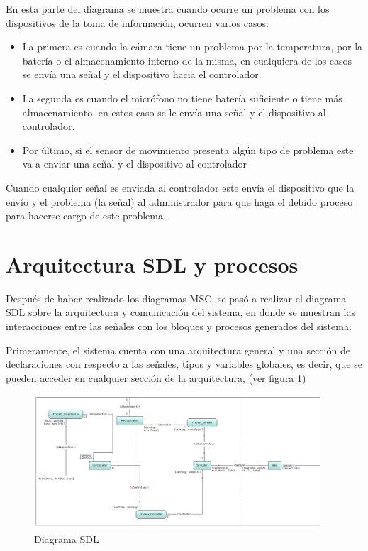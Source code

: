 En esta parte del diagrama se muestra cuando ocurre un problema con los dispositivos de la toma de información, ocurren varios casos:

\begin{itemize}
    \item La primera es cuando la cámara tiene un problema por la temperatura, por la batería o el almacenamiento interno de la misma, en cualquiera de los casos se envía una señal y el dispositivo hacia el controlador.
    \item La segunda es cuando el micrófono no tiene batería suficiente o tiene más almacenamiento, en estos caso se le envía una señal y el dispositivo al controlador.
    \item Por último, si el sensor de movimiento presenta algún tipo de problema este va a enviar una señal y el dispositivo al controlador
\end{itemize}

Cuando cualquier señal es enviada al controlador este envía el dispositivo que la envío y el problema (la señal) al administrador para que haga el debido proceso para hacerse cargo de este problema.

\section{Arquitectura SDL y procesos}
Después de haber realizado los diagramas MSC, se pasó a realizar el diagrama SDL sobre la arquitectura y comunicación del sistema, en donde se muestran las interacciones entre las señales con los bloques y procesos generados del sistema.

Primeramente, el sistema cuenta con una arquitectura general y una sección de declaraciones con respecto a las señales, tipos y variables globales, es decir, que se pueden acceder en cualquier sección de la arquitectura, (ver figura \ref{SDL_General})

\begin{figure}[h]
    \centering
    \includegraphics[width=0.95\textwidth]{images/SDL_General1.png}
    \caption{Diagrama SDL}
    \label{SDL_General}
\end{figure}

